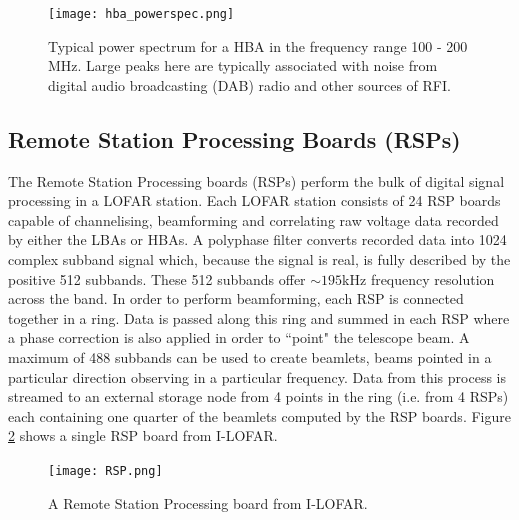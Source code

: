 \begin{figure}
    \centering
    \texttt{[image: hba\_powerspec.png]}
    \caption[Typical power spectrum for a HBA 100 - 200 MHz.]{Typical power spectrum for a HBA in the frequency range 100 - 200 MHz. Large peaks here are typically associated with noise from digital audio broadcasting (DAB) radio and other sources of RFI.}
    \label{fig:HBA_power_spec}
\end{figure}

\subsection{Remote Station Processing Boards (RSPs)}
\label{sec:rsp}
The Remote Station Processing boards (RSPs) perform the bulk of digital signal processing in a LOFAR station. Each LOFAR station consists of 24 RSP boards capable of channelising, beamforming and correlating raw voltage data recorded by either the LBAs or HBAs. A polyphase filter converts recorded data into 1024 complex subband signal which, because the signal is real, is fully described by the positive 512 subbands. These 512 subbands offer $\sim 195$kHz frequency resolution across the band. In order to perform beamforming, each RSP is connected together in a ring. Data is passed along this ring and summed in each RSP where a phase correction is also applied in order to ``point" the telescope beam. A maximum of 488 subbands can be used to create beamlets, beams pointed in a particular direction observing in a particular frequency. Data from this process is streamed to an external storage node from 4 points in the ring (i.e. from 4 RSPs) each containing one quarter of the beamlets computed by the RSP boards. Figure \ref{fig:RSP} shows a single RSP board from I-LOFAR.

\begin{figure}
\centering
\texttt{[image: RSP.png]}
\caption[A Remote Station Processing board.]{A Remote Station Processing board from I-LOFAR.}
\label{fig:RSP}
\end{figure}

